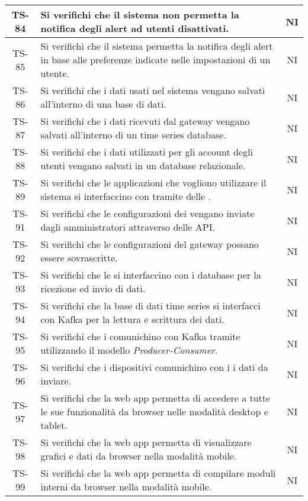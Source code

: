 \begin{center}
\begin{longtable}{|c|p{10cm}|c|}
			 \hline
			 TS-84 & Si verifichi che il sistema non permetta la notifica degli alert ad utenti disattivati. & NI \\
			 \hline
			 TS-85 & Si verifichi che il sistema permetta la notifica degli alert in base alle preferenze indicate nelle impostazioni di un utente. & NI \\
			 \hline
			 TS-86 & Si verifichi che i dati usati nel sistema vengano salvati all'interno di una base di dati. & NI \\
			 \hline
			 TS-87 & Si verifichi che i dati ricevuti dal gateway vengano salvati all'interno di un time series database. & NI \\
			 \hline
			 TS-88 & Si verifichi che i dati utilizzati per gli account degli utenti vengano salvati in un database relazionale. & NI \\
			 \hline
			 TS-89 & Si verifichi che le applicazioni che vogliono utilizzare il sistema si interfaccino con \glock{Kafka} tramite delle \glock{API}. & NI \\
			 \hline
			 TS-91 & Si verifichi che le configurazioni dei \glock{gateway} vengano inviate dagli amministratori attraverso delle API. & NI \\
			 \hline
			 TS-92 & Si verifichi che le configurazioni del gateway possano essere sovrascritte. & NI \\
			 \hline
			 TS-93 & Si verifichi che le \glock{API} si interfaccino con i database per la ricezione ed invio di dati. & NI \\
			 \hline
			 TS-94 & Si verifichi che la base di dati time series si interfacci con Kafka per la lettura e scrittura dei dati. & NI \\
			 \hline
			 TS-95 & Si verifichi che i \glock{gateway} comunichino con Kafka tramite \glock{topic} utilizzando il modello \textit{Producer-Consumer}. & NI \\
			 \hline
			 TS-96 & Si verifichi che i dispositivi comunichino con i \glock{gateway} i dati da inviare. & NI \\
			 \hline
			 TS-97 & Si verifichi che la web app permetta di accedere a tutte le sue funzionalità da browser nelle modalità desktop e tablet. & NI \\
			 \hline
			 TS-98 & Si verifichi che la web app permetta di visualizzare grafici e dati da browser nella modalità mobile. & NI \\
			 \hline
			 TS-99 & Si verifichi che la web app permetta di compilare moduli interni da browser nella modalità mobile. & NI \\

\end{longtable}
\end{center}
